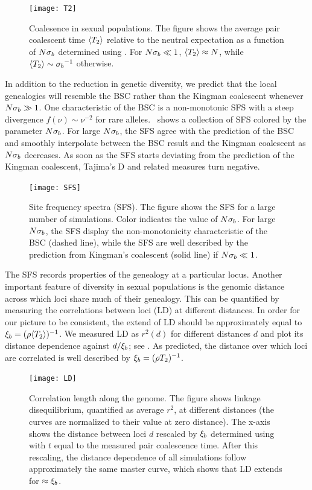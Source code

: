 \begin{figure}
  \centering
  \texttt{[image: T2]}
  \caption{Coalesence in sexual populations. The figure shows the
    average pair
    coalescent time $\langle T_2\rangle$ relative to the neutral expectation as a
    function of $N{\sigma_b}$ determined using . For $N{\sigma_b}\ll 1$, $\langle T_2\rangle\approx N$,
    while $\langle T_2\rangle\sim {\sigma_b}^{-1}$ otherwise. }
  \label{fig:Ttwo}
\end{figure}

In addition to the reduction in genetic diversity, we predict that the
local genealogies will resemble the BSC
rather than the Kingman coalescent whenever $N{\sigma_b}\gg 1$. One
characteristic of the BSC is a non-monotonic SFS with a steep
divergence $f(\nu)\sim\nu^{-2}$ for rare alleles. \FigSFS~shows a
collection of SFS colored by the parameter $N{\sigma_b}$. For large
$N{\sigma_b}$, the SFS agree with the prediction of the BSC and
smoothly interpolate between the BSC result and the Kingman coalescent
as $N{\sigma_b}$ decreases. As soon as the SFS starts deviating from
the prediction of the Kingman coalescent, Tajima's D and related
measures turn negative.  


\begin{figure}
  \centering
  \texttt{[image: SFS]}  
  \caption{Site frequency spectra (SFS). The figure shows the SFS for a
    large number of simulations. Color indicates the value of
    $N{\sigma_b}$. For large $N{\sigma_b}$, the SFS display the
    non-monotonicity characteristic of the BSC (dashed line), while the
    SFS are well described by the prediction from Kingman's coalescent
    (solid line) if $N{\sigma_b}\ll 1$. }
  \label{fig:SFS}
\end{figure}

The SFS records properties of the genealogy at a particular
locus. Another important feature of diversity in sexual populations is
the genomic distance across which loci share much of their
genealogy. This can be quantified by measuring the correlations between
loci (LD) at different distances. In order for our picture to be
consistent, the extend of LD should be approximately equal to ${\xi_b} = (\rho
\langle T_2\rangle)^{-1}$. We measured LD as $r^2(d)$ for different distances $d$ and
plot its distance dependence against $d/{\xi_b}$; see \FigLD. As
predicted, the distance over which loci are correlated
is well described by ${\xi_b} =(\rho T_2)^{-1}$.

\begin{figure}
  \centering
  \texttt{[image: LD]}
  \caption{Correlation length along the genome. The figure shows
    linkage disequilibrium, quantified as average $r^2$, at different
    distances (the curves are normalized to their value at zero
    distance). The x-axis shows the distance between loci $d$ rescaled by
    ${\xi_b}$ determined using  with $t$ equal to the measured pair
    coalescence time. After this rescaling, the distance dependence of all
    simulations follow approximately the same master curve, which
    shows that LD extends for $\approx {\xi_b}$. }
  \label{fig:LD}
\end{figure}


